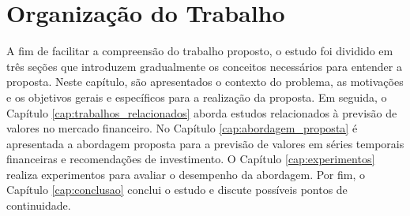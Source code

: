 \section{Organização do Trabalho}
\label{subsec:organização}
A fim de facilitar a compreensão do trabalho proposto, o estudo foi dividido em três seções que introduzem gradualmente os conceitos necessários para entender a proposta. Neste capítulo, são apresentados o contexto do problema, as motivações e os objetivos gerais e específicos para a realização da proposta. Em seguida, o Capítulo \ref{cap:trabalhos_relacionados} aborda estudos relacionados à previsão de valores no mercado financeiro. No Capítulo \ref{cap:abordagem_proposta} é apresentada a abordagem proposta para a previsão de valores em séries temporais financeiras e recomendações de investimento. O Capítulo \ref{cap:experimentos} realiza experimentos para avaliar o desempenho da abordagem. Por fim, o Capítulo \ref{cap:conclusao} conclui o estudo e discute possíveis pontos de continuidade. 

\newpage

